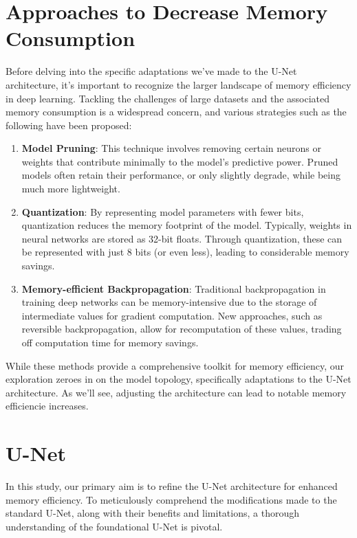 \section{Approaches to Decrease Memory Consumption}
Before delving into the specific adaptations we've made to the U-Net architecture, it's important to recognize the larger landscape of memory efficiency in deep learning.
Tackling the challenges of large datasets and the associated memory consumption is a widespread concern,
and various strategies such as the following have been proposed:
\begin{enumerate}
	\item \textbf{Model Pruning}: This technique involves removing certain neurons or weights that contribute minimally to the model's predictive power.
	Pruned models often retain their performance, or only slightly degrade, while being much more lightweight.\cite{chong_resource_2023}
	\item \textbf{Quantization}: By representing model parameters with fewer bits, quantization reduces the memory footprint of the model. Typically,
	weights in neural networks are stored as 32-bit floats. Through quantization, these can be represented with just 8 bits (or even less), leading to considerable memory savings.\cite{gholami_survey_2021}
	\item \textbf{Memory-efficient Backpropagation}: Traditional backpropagation in training deep networks can be memory-intensive due to the storage of intermediate values for gradient computation.
	New approaches, such as reversible backpropagation, allow for recomputation of these values, trading off computation time for memory savings.\cite{brugger_partially_2019}
\end{enumerate}
While these methods provide a comprehensive toolkit for memory efficiency, our exploration zeroes in on the model topology, specifically adaptations to the U-Net architecture.
As we'll see, adjusting the architecture can lead to notable memory efficiencie increases.

\section{U-Net}
In this study, our primary aim is to refine the U-Net architecture for enhanced memory efficiency. To meticulously comprehend the modifications made to the standard U-Net,
along with their benefits and limitations, a thorough understanding of the foundational U-Net is pivotal.

